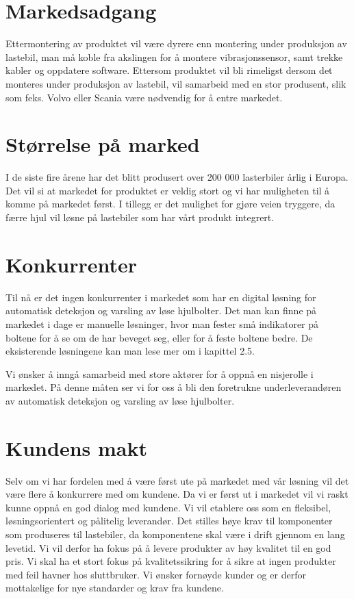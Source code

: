 \section{Markedsadgang}
Ettermontering av produktet vil være dyrere enn montering under produksjon av 
lastebil, man må koble fra akslingen for å montere vibrasjonssensor, samt 
trekke kabler og oppdatere software. Ettersom produktet vil bli rimeligst 
dersom det monteres under produksjon av lastebil, vil  samarbeid med en stor 
produsent, slik som feks. Volvo eller Scania være nødvendig for å entre markedet. 

\section{Størrelse på marked}
I de siste fire årene har det blitt produsert over 200 000 lasterbiler årlig 
i Europa\cite{lastebilprod-DAF}. Det vil si at markedet for produktet er 
veldig stort og vi har muligheten til å komme på markedet først. I tillegg er 
det mulighet for gjøre veien tryggere, da færre hjul vil løsne på lastebiler 
som har vårt produkt integrert.

\section{Konkurrenter}
Til nå er det ingen konkurrenter i markedet som har en digital løsning for 
automatisk deteksjon og varsling av løse hjulbolter. Det man kan finne på 
markedet i dage er manuelle løsninger, hvor man fester små indikatorer på 
boltene for å se om de har beveget seg, eller for å feste boltene bedre. De 
eksisterende løsningene kan man lese mer om i kapittel 2.5.

Vi ønsker å inngå samarbeid med store aktører for å oppnå en nisjerolle i 
markedet. På denne måten ser vi for oss å bli den foretrukne 
underleverandøren av automatisk deteksjon og varsling av løse hjulbolter.

\section{Kundens makt}
Selv om vi har fordelen med å være først ute på markedet med vår løsning vil 
det være flere å konkurrere med om kundene. Da vi er først ut i markedet vil 
vi raskt kunne oppnå en god dialog med kundene. Vi vil etablere oss som en 
fleksibel, løsningsorientert og pålitelig leverandør. Det stilles høye krav 
til komponenter som produseres til lastebiler, da komponentene skal være i 
drift gjennom en lang levetid. Vi vil derfor ha fokus på å levere produkter 
av høy kvalitet til en god pris. Vi skal ha et stort fokus på 
kvalitetssikring for å sikre at ingen produkter med feil havner hos 
sluttbruker. Vi ønsker fornøyde kunder og er derfor mottakelige for nye 
standarder og krav fra kundene. 

